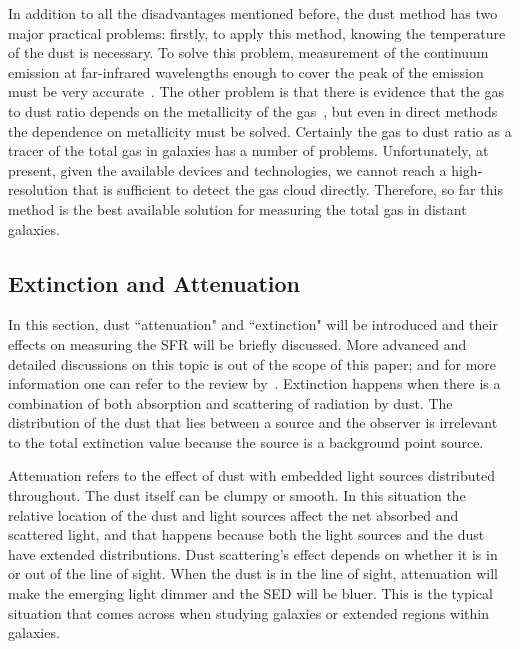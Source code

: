 In addition to all the disadvantages mentioned before, the dust method has two major practical problems: firstly, to apply this method, knowing the temperature of the dust is necessary. 
To solve this problem, measurement of the continuum emission at far-infrared wavelengths enough to cover the peak of the emission must be very accurate~\citep{Ealas12}. 
The other problem is that there is evidence that the gas to dust ratio depends on the metallicity of the gas~\citep{Lisenfeld98, Draine07}, but even in direct methods the dependence on metallicity must be solved. 
Certainly the gas to dust ratio as a tracer of the total gas in galaxies has a number of problems. 
Unfortunately, at present, given the available devices and technologies, we cannot reach a high-resolution that is sufficient to detect the gas cloud directly.
Therefore, so far this method is the best available solution for measuring the total gas in distant galaxies. 

\subsection{Extinction and Attenuation}
\label{sec: extinction}
In this section, dust ``attenuation" and ``extinction" will be introduced and their effects on measuring the SFR will be briefly discussed.
More advanced and detailed discussions on this topic is out of the scope of this paper; and for more information one can refer to the review by~\citep{Calzetti01}. 
Extinction happens when there is a combination of both absorption and scattering of radiation by dust. The distribution of the dust that lies between a source and the observer is irrelevant to the total extinction value because the source is a background point source.

Attenuation refers to the effect of dust with embedded light sources distributed throughout. 
The dust itself can be clumpy or smooth\citep{Calzetti13}. 
In this situation the relative location of the dust and light sources affect the net absorbed and scattered light, and that happens because both the light sources and the dust have extended distributions. 
Dust scattering's effect depends on whether it is in or out of the line of sight. 
When the dust is in the line of sight, attenuation will make the emerging light dimmer and the SED will be bluer. 
This is the typical situation that comes across when studying galaxies or extended regions within galaxies.

